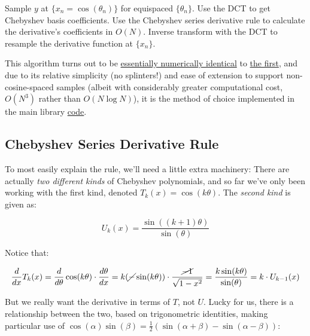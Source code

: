 \documentclass[10pt]{article}
\begin{document}
\begin{algorithm}
\caption*{\textbf{Chebyshev Derivative via Series Rule}}
\begin{algorithmic}[1] %
\STATE Sample $y$ at $\{x_n = \cos(\theta_n)\}$ for equispaced $\{\theta_n\}$.
\STATE Use the DCT to get Chebyshev basis coefficients.
\STATE Use the Chebyshev series derivative rule to calculate the derivative's coefficients in $O(N)$.
\STATE Inverse transform with the DCT to resample the derivative function at $\{x_n\}$.
\end{algorithmic}
\end{algorithm}

This algorithm turns out to be \href{https://github.com/pavelkomarov/spectral-derivatives/blob/main/notebooks/alternative_chebyshev_derivative_methods.ipynb}{essentially numerically identical} to \hyperref[algo]{the first}, and due to its relative simplicity (no splinters!) and ease of extension to support non-cosine-spaced samples (albeit with considerably greater computational cost, $O(N^3)$ rather than $O(N \log N)$), it is the method of choice implemented in the main library \href{https://github.com/pavelkomarov/spectral-derivatives/blob/main/specderiv/specderiv.py}{code}.

\subsection{Chebyshev Series Derivative Rule}\label{seriesrule}

To most easily explain the rule, we'll need a little extra machinery: There are actually \textit{two different kinds} of Chebyshev polynomials, and so far we've only been working with the first kind, denoted $T_k(x) = \cos(k\theta)$. The \textit{second kind} is given as:

$$U_k(x) = \frac{\sin((k+1)\theta)}{\sin(\theta)}$$

\noindent Notice that:

$$\frac{d}{dx} T_k(x) = \frac{d}{d\theta} \cos(k\theta) \cdot \frac{d\theta}{dx} = k(\cancel{-}\sin(k\theta)) \cdot \frac{\cancel{-1}}{\sqrt{1-x^2}} = \frac{k\sin(k\theta)}{\sin(\theta)} = k \cdot U_{k-1}(x)$$

But we really want the derivative in terms of $T$, not $U$. Lucky for us, there is a relationship between the two, based on trigonometric identities, making particular use of $\cos(\alpha)\sin(\beta) = \frac{1}{2}(\sin(\alpha + \beta) - \sin(\alpha - \beta))$:
\end{document}

